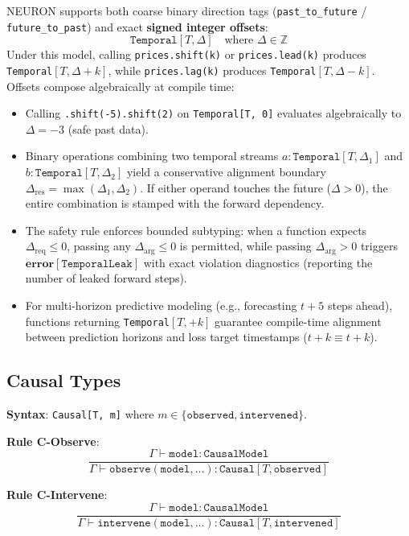 \documentclass[11pt,a4paper]{article}
\newcommand{\ty}[1]{\texttt{#1}}
\begin{document}
NEURON supports both coarse binary direction tags (\ty{past\_to\_future} / \ty{future\_to\_past}) and exact \textbf{signed integer offsets}:
\[
\ty{Temporal}[T, \Delta] \quad \text{where } \Delta \in \mathbb{Z}
\]
Under this model, calling \ty{prices.shift(k)} or \ty{prices.lead(k)} produces \ty{Temporal}$[T, \Delta+k]$, while \ty{prices.lag(k)} produces \ty{Temporal}$[T, \Delta-k]$. Offsets compose algebraically at compile time:
\begin{itemize}[leftmargin=1.5em]
  \item Calling \ty{.shift(-5).shift(2)} on \ty{Temporal[T, 0]} evaluates algebraically to $\Delta = -3$ (safe past data).
  \item Binary operations combining two temporal streams $a : \ty{Temporal}[T, \Delta_1]$ and $b : \ty{Temporal}[T, \Delta_2]$ yield a conservative alignment boundary $\Delta_{\text{res}} = \max(\Delta_1, \Delta_2)$. If either operand touches the future ($\Delta > 0$), the entire combination is stamped with the forward dependency.
  \item The safety rule enforces bounded subtyping: when a function expects $\Delta_{\text{req}} \leq 0$, passing any $\Delta_{\text{arg}} \leq 0$ is permitted, while passing $\Delta_{\text{arg}} > 0$ triggers $\textbf{error}[\ty{TemporalLeak}]$ with exact violation diagnostics (reporting the number of leaked forward steps).
  \item For multi-horizon predictive modeling (e.g., forecasting $t+5$ steps ahead), functions returning \ty{Temporal}$[T, +k]$ guarantee compile-time alignment between prediction horizons and loss target timestamps ($t+k \equiv t+k$).
\end{itemize}

\subsection{Causal Types}
\label{sec:causal}

\textbf{Syntax}: \ty{Causal[T, m]} where $m \in \{\ty{observed}, \ty{intervened}\}$.

\textbf{Rule C-Observe}:
\begin{equation}
\frac{\Gamma \vdash \ty{model} : \ty{CausalModel}}{\Gamma \vdash \ty{observe}(\ty{model}, \ldots) : \ty{Causal}[T, \ty{observed}]}
\end{equation}

\textbf{Rule C-Intervene}:
\begin{equation}
\frac{\Gamma \vdash \ty{model} : \ty{CausalModel}}{\Gamma \vdash \ty{intervene}(\ty{model}, \ldots) : \ty{Causal}[T, \ty{intervened}]}
\end{equation}
\end{document}
